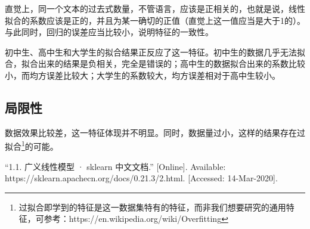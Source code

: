 \documentclass[]{article}
\begin{document}
直觉上，同一个文本的过去式数量，不管语言，应该是正相关的，也就是说，线性拟合的系数应该是正的，并且为某一确切的正值（直觉上这一值应当是大于1的）。与此同时，回归的误差应当比较小，说明特征的一致性。

初中生、高中生和大学生的拟合结果正反应了这一特征。初中生的数据几乎无法拟合，拟合出来的结果是负相关，完全是错误的；高中生的数据拟合出来的系数比较小，而均方误差比较大；大学生的系数较大，均方误差相对于高中生较小。

\subsection{局限性}

数据效果比较差，这一特征体现并不明显。同时，数据量过小，这样的结果存在过拟合\footnote{过拟合即学到的特征是这一数据集特有的特征，而非我们想要研究的通用特征，可参考：https://en.wikipedia.org/wiki/Overfitting}的可能。

\begin{thebibliography}{99}  
	“1.1. 广义线性模型 · sklearn 中文文档.” [Online]. Available: https://sklearn.apachecn.org/docs/0.21.3/2.html. [Accessed: 14-Mar-2020].
	
\end{thebibliography}
\end{document}
